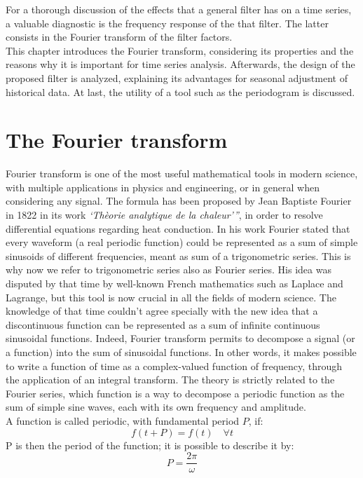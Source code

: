 \documentclass{article}
\begin{document}
For a thorough discussion of the effects that a general filter has on a time series, a valuable diagnostic is the frequency response of the that filter. The latter consists in the Fourier transform of the filter factors.\\This chapter introduces the Fourier transform, considering its properties and the reasons why it is important for time series analysis. Afterwards, the design of the proposed filter is analyzed, explaining its advantages for seasonal adjustment of historical data. At last, the utility of a tool such as the periodogram is discussed.
\section{The Fourier transform}
Fourier transform is one of the most useful mathematical tools in modern science, with multiple applications in physics and engineering, or in general when considering any signal. The formula has been proposed by Jean Baptiste Fourier in 1822 in its work \textit{`Thèorie analytique de la chaleur'”}, in order to resolve differential equations regarding heat conduction. In his work Fourier stated that every waveform (a real periodic function) could be represented as a sum of simple sinusoids of different frequencies, meant as sum of a trigonometric series. This is why now we refer to trigonometric series also as Fourier series. His idea was disputed by that time by well-known French mathematics such as Laplace and Lagrange, but this tool is now crucial in all the fields of modern science. The knowledge of that time couldn't agree specially with the new idea that a discontinuous function can be represented as a sum of infinite continuous sinusoidal functions. Indeed, Fourier transform permits to decompose a signal (or a function) into the sum of sinusoidal functions. In other words, it makes possible to write a function of time as a complex-valued function of frequency, through the application of an integral transform. The theory is strictly related to the Fourier series, which function is a way to decompose a periodic function as the sum of simple sine waves, each with its own frequency and amplitude.\\A function is called periodic, with fundamental period $P$, if:
\begin{equation}
f(t+P)=f(t) \quad \forall t 
\end{equation}
P is then the period of the function; it is possible to describe it by:
\begin{equation}
P=\frac{2\pi}{\omega}
\end{equation}
\end{document}
